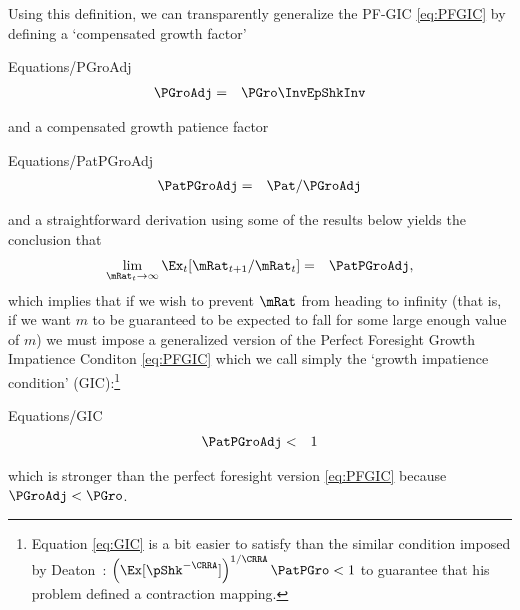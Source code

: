 \documentclass[titlepage]{\econtex}\providecommand{\texname}{BufferStockTheory}%
\providecommand{\EqDir}{Equations}
\begin{document}
Using this definition, we can transparently generalize the PF-GIC \eqref{eq:PFGIC} by defining a `compensated growth factor'
\begin{verbatimwrite}{\EqDir/PGroAdj}
\begin{eqnarray}
  \PGroAdj & = &  \PGro \InvEpShkInv \label{eq:PGroAdj}
\end{eqnarray}
\end{verbatimwrite}

and a compensated growth patience factor
\begin{verbatimwrite}{\EqDir/PatPGroAdj}
\begin{eqnarray}
  \PatPGroAdj & = & \Pat/\PGroAdj
\end{eqnarray}
\end{verbatimwrite}

and a straightforward derivation
using some of the results below yields the conclusion that
\begin{eqnarray*}
  \lim_{\mRat_{t} \rightarrow \infty} \Ex_{t}[\mRat_{t+1}/\mRat_{t}] & = & \PatPGroAdj,
\end{eqnarray*}
which implies that if we wish to prevent $\mRat$ from heading to infinity (that is, if we want $m$ to be guaranteed to be expected to fall for some large enough value of $m$) we must impose a generalized version of the Perfect Foresight Growth Impatience Conditon \eqref{eq:PFGIC} which we call simply the `growth impatience condition' (GIC):\footnote{Equation \eqref{eq:GIC} is a bit easier to satisfy than the similar condition imposed by Deaton~\citeyearpar{deatonLiqConstr}: $\left(\Ex[\pShk^{-\CRRA}]\right)^{1/\CRRA} \PatPGro < 1$ to guarantee that his problem defined a contraction mapping.}
\begin{verbatimwrite}{\EqDir/GIC}
\begin{eqnarray}
  \PatPGroAdj & < & 1 \label{eq:GIC}
\end{eqnarray}\end{verbatimwrite}

which is stronger than the perfect foresight version \eqref{eq:PFGIC} because $\PGroAdj < \PGro$.
\end{document}

